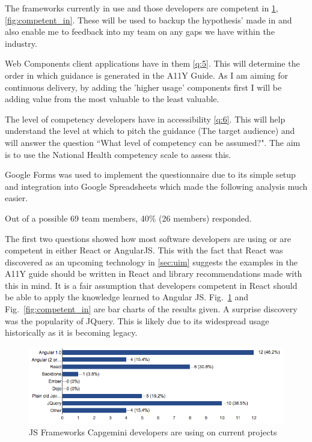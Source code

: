 The frameworks currently in use and those developers are competent in
\ref{fig:current_proj}, \ref{fig:competent_in}. These will be used to backup the hypothesis' made in
\label{sec:uim} and also enable me to feedback into my team on any gaps we
have within the industry.

Web Components client applications have in them \ref{q:5}. This will
determine the order in which guidance is generated in the A11Y Guide.
As I am aiming for continuous delivery, by adding the 'higher usage'
components first I will be adding value from the most valuable to the least
valuable.

The level of competency developers have in accessibility \ref{q:6}. This will
help understand the level at which to pitch the guidance (The target audience)
and will answer the question ``What level of competency can be assumed?". The
aim is to use the National Health competency scale \citep{NHComptency} to
assess this.

Google Forms was used to implement the questionnaire due to its simple
setup and integration into Google Spreadsheets which made the following
analysis much easier.

Out of a possible 69 team members, 40\% (26 members) responded.

The first two questions showed how most software developers are using or are
competent in either React or AngularJS. This with the fact that
React was discovered as an upcoming technology in \ref{sec:uim} suggests the
examples in the A11Y guide should be written in React and library
recommendations made with this in mind. It is a fair assumption that
developers competent in React should be able to apply the knowledge learned
to Angular JS. Fig.~\ref{fig:current_proj} and Fig.~\ref{fig:competent_in}
are bar charts of the results given. A surprise discovery was the popularity
of JQuery. This is likely due to its widespread usage historically as it is becoming legacy.

\begin{figure}[H]
\centering
\centering
\includegraphics[width=\textwidth]{figures/questions/frameworks_in_use}
\captionsetup{justification=centering}
\caption{JS Frameworks Capgemini developers are using on current projects
\label{fig:current_proj}}
\end{figure}

